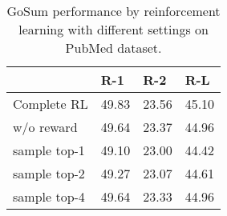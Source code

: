 \documentclass[11pt,a4paper]{article}
\begin{document}
\begin{table}[t]
  \centering
  \begin{tabular}{l|p{13mm}p{13mm}p{13mm}}\toprule
                    & \hfil R-1  & \hfil R-2  & \hfil R-L    \\ \midrule
        Complete RL                  & \hfil 49.83 & \hfil 23.56 & \hfil 45.10   \\
        \quad w/o reward             & \hfil 49.64 & \hfil 23.37 & \hfil 44.96   \\
        \quad sample top-1          & \hfil 49.10 & \hfil 23.00 & \hfil 44.42   \\
        \quad sample top-2          & \hfil 49.27 & \hfil 23.07 & \hfil 44.61   \\
        \quad sample top-4          & \hfil 49.64 & \hfil 23.33 & \hfil 44.96   \\ \bottomrule
  \end{tabular}
   \caption{ GoSum performance by reinforcement learning with different settings on PubMed dataset.} \label{tab:exp3}
\end{table}  







\end{document}
